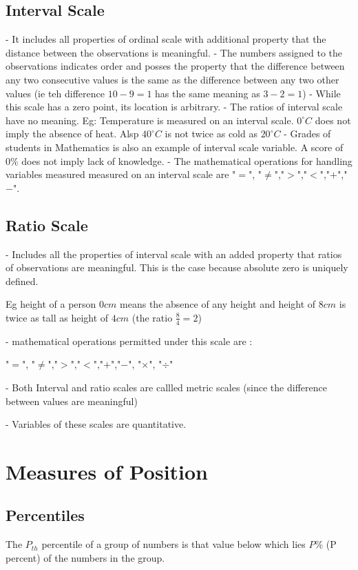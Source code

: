 \documentclass[12pt,a4paper]{article}
\begin{document}
\subsection{Interval Scale}
- It includes all properties of ordinal scale with additional property that the distance between the observations is meaningful.
- The numbers assigned to the observations indicates order and posses the property that the difference between any two consecutive values is the same as the difference between any two other values (ie teh difference $10 - 9 = 1$ has the same meaning as $3 - 2 = 1$)
- While this scale has a zero point, its location is arbitrary.
- The ratios of interval scale have no meaning.
Eg: Temperature is measured on an interval scale. $0^{\circ}C$ does not imply the absence of heat. Alsp $40^{\circ}C$ is not twice as cold as $20^{\circ}C$
- Grades of students in Mathematics is also an example of interval scale variable. A score of $0\%$ does not imply lack of knowledge.
- The mathematical operations for handling variables measured measured on an interval scale are "$=$", "$\neq$","$>$","$<$","$+$","$-$".
\subsection{Ratio Scale}
- Includes all the properties of interval scale with an added property that ratios of observations are meaningful. This is the case because absolute zero is uniquely defined.

Eg height of a person $0cm$ means the absence of any height and height of $8cm$ is twice as tall as height of $4cm$ (the ratio $\frac{8}{4} = 2$)

- mathematical operations permitted under this scale are :

"$=$", "$\neq$","$>$","$<$","$+$","$-$", "$\times$", "$\div$"

- Both Interval and ratio scales are callled metric scales (since the difference between values are meaningful)

- Variables of these scales are quantitative.

\section{Measures of Position}

\subsection{Percentiles}
The $P_{th}$ percentile of a group of numbers is that value below which lies $P\%$ (P percent) of the numbers in the group.
\end{document}
